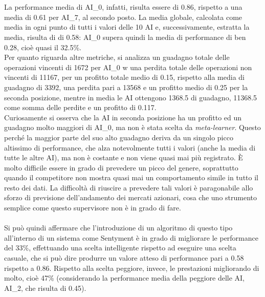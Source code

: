 \documentclass[a4paper,12pt]{report}
\begin{document}
\begin{fig}
\\~\\La performance media di AI\_0, infatti, risulta essere di 0.86, rispetto a una media di 0.61 per AI\_7, al secondo posto. La media globale, calcolata come media in ogni punto di tutti i valori delle 10 AI e, successivamente, estratta la media, risulta di di 0.58: AI\_0 supera quindi la media di performance di ben 0.28, cioè quasi il 32.5\%.\\Per quanto riguarda altre metriche, si analizza un guadagno totale delle operazioni vincenti di 1672 per AI\_0 w una perdita totale delle operazioni non vincenti di 11167, per un profitto totale medio di 0.15, rispetto alla media di guadagno di 3392, una perdita pari a 13568 e un profitto medio di 0.25 per la seconda posizione, mentre in media le AI ottengono 1368.5 di guadagno, 11368.5 come somma delle perdite e un profitto di 0.117.\\ Curiosamente si osserva che la AI in seconda posizione ha un profitto ed un guadagno molto maggiori di AI\_0, ma non è stata scelta da \textit{meta-learner}. Questo perché la maggior parte del suo alto guadagno deriva da un singolo picco altissimo di performance, che alza notevolmente tutti i valori (anche la media di tutte le altre AI), ma non è costante e non viene quasi mai più registrato. È molto difficile essere in grado di prevedere un picco del genere, soprattutto quando il competitore non mostra quasi mai un comportamento simile in tutto il resto dei dati. La difficoltà di riuscire a prevedere tali valori è paragonabile allo sforzo di previsione dell'andamento dei mercati azionari, cosa che uno strumento semplice come questo supervisore non è in grado di fare.
\\~\\ Si può quindi affermare che l'introduzione di un algoritmo di questo tipo all'interno di un sistema come Sentyment è in grado di migliorare le performance del 33\%, effettuando una scelta intelligente rispetto ad eseguire una scelta casuale, che si può dire produrre un valore atteso di performance pari a 0.58 rispetto a 0.86. Rispetto alla scelta peggiore, invece, le prestazioni migliorando di molto, cioè 47\% (considerando la performance media della peggiore delle AI, AI\_2, che risulta di 0.45).


\end{fig}
\end{document}
